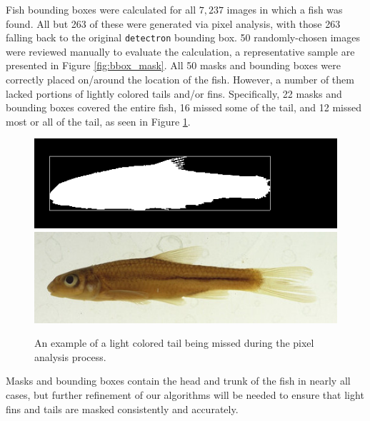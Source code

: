 \documentclass[conference]{IEEEtran}
\begin{document}
Fish bounding boxes were calculated for all \(7,237\) images in which a fish was found. All but 263 of these were generated via pixel analysis, with those 263 falling back to the original \verb|detectron| bounding box.
50 randomly-chosen images were reviewed manually to evaluate the
calculation, a representative sample are presented in
Figure \ref{fig:bbox_mask}.
All 50 masks and bounding boxes were correctly placed
on/around the location of the fish. However, a number of them lacked portions of lightly colored tails and/or fins.
Specifically, 22 masks and bounding boxes covered the entire fish,
16 missed some of the tail, and 12 missed most or all of the tail, as
seen in Figure \ref{fig:missedTail}.
\begin{figure}[H]
  \centering
  \includegraphics[width=0.49\linewidth]{images/61631}
  \includegraphics[width=0.49\linewidth]{images/61631_mask}
  \caption{An example of a light colored tail being missed during the pixel analysis process.}
  \label{fig:missedTail}
\end{figure}
Masks and bounding boxes contain the head and trunk of the fish in nearly all cases, but further refinement of our algorithms will be needed
to ensure that light fins and tails are masked consistently and accurately.
\end{document}
